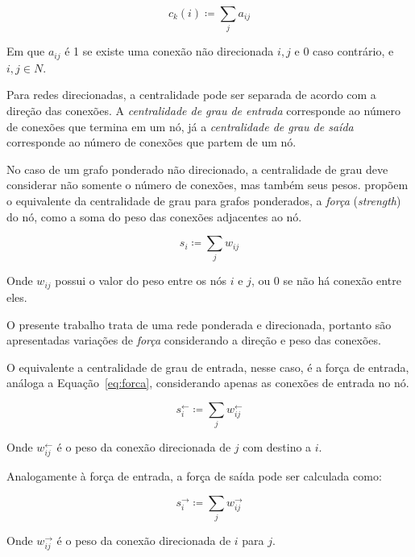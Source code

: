 \documentclass[12pt,a4paper,final]{article}
\newcommand{\defn}{\coloneqq} %
\newcommand{\linkin}[1]{#1^\leftarrow} %
\newcommand{\linkout}[1]{#1^\rightarrow} %
\newcommand{\win}{w^\leftarrow} %
\newcommand{\wout}{w^\rightarrow} %
\begin{document}
\begin{equation} \label{eq:centralidade-grau}
c_k(i) \defn \sum_{j} a_{ij}
\end{equation}

Em que $a_{ij}$ é 1 se existe uma conexão não direcionada $i, j$ e 0 caso contrário, e $i,j \in N$. 

Para redes direcionadas, a centralidade pode ser separada de acordo com a direção das conexões. A \textit{centralidade de grau de entrada} corresponde ao número de conexões que termina em um nó, já a \textit{centralidade de grau de saída} corresponde ao número de conexões que partem de um nó.

No caso de um grafo ponderado não direcionado, a centralidade de grau deve considerar não somente o número de conexões, mas também seus pesos.  propõem o equivalente da centralidade de grau para grafos ponderados, a \textit{força} (\textit{strength}) do nó, como a soma do peso das conexões adjacentes ao nó.

\begin{equation} \label{eq:forca}
s_i \defn \sum_{j} w_{ij}
\end{equation}

Onde $w_{ij}$ possui o valor do peso entre os nós $i$ e $j$, ou 0 se não há conexão entre eles.

O presente trabalho trata de uma rede ponderada e direcionada, portanto são apresentadas variações de \textit{força} considerando a direção e peso das conexões.

O equivalente a centralidade de grau de entrada, nesse caso, é a força de entrada, análoga a Equação~\ref{eq:forca}, considerando apenas as conexões de entrada no nó.

\begin{equation} \label{eq:forca-entrada}
\linkin{s}_i \defn \sum_{j} \win_{ij}
\end{equation}

Onde $\win_{ij}$ é o peso da conexão direcionada de $j$ com destino a $i$.

Analogamente à força de entrada, a força de saída pode ser calculada como:

\begin{equation} \label{eq:forca-saida}
\linkout{s}_i \defn \sum_{j} \wout_{ij}
\end{equation}

Onde $\wout_{ij}$ é o peso da conexão direcionada de $i$ para $j$.

\end{document}
